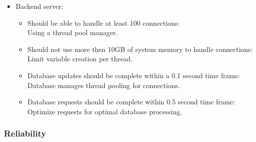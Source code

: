 \documentclass[letterpaper]{article}
\begin{document}
\begin{itemize}
						\item Backend server:
							\begin{itemize}
								\item Should be able to handle at least 100 connections: \\
										Using a thread pool manager.
								\item Should not use more then 10GB of system memory to handle connections: \\
										Limit variable creation per thread.
								\item Database updates should be complete within a 0.1 second time frame: \\
										Database manages thread pooling for connections.
								\item Database requests should be complete within 0.5 second time frame: \\
										Optimize requests for optimal database processing. 
							\end{itemize}
					\end{itemize}
				
				\subsubsection*{Reliability}
				\vspace{0.1in}
				
\end{document}
